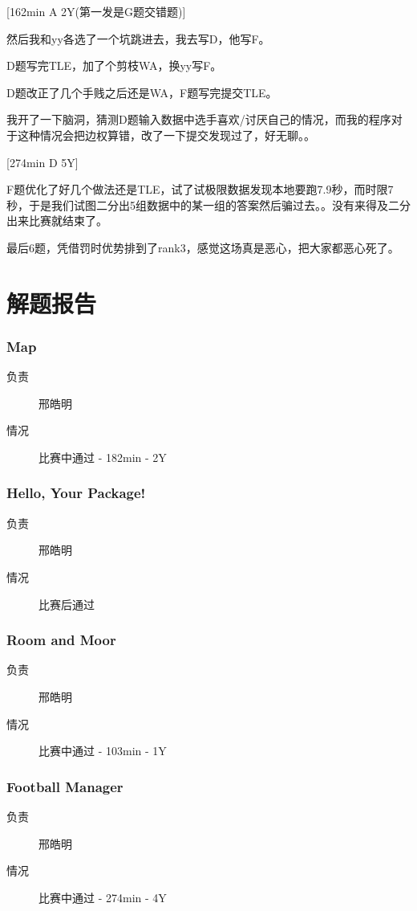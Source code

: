 \documentclass[a4paper, 11pt, nofonts, nocap, fancyhdr]{ctexart}
\newcommand{\problem}[1]{\subsubsection{#1}}
\begin{document}
[162min A 2Y(第一发是G题交错题)]

然后我和yy各选了一个坑跳进去，我去写D，他写F。

D题写完TLE，加了个剪枝WA，换yy写F。

D题改正了几个手贱之后还是WA，F题写完提交TLE。

我开了一下脑洞，猜测D题输入数据中选手喜欢/讨厌自己的情况，而我的程序对于这种情况会把边权算错，改了一下提交发现过了，好无聊。。

[274min D 5Y]

F题优化了好几个做法还是TLE，试了试极限数据发现本地要跑7.9秒，而时限7秒，于是我们试图二分出5组数据中的某一组的答案然后骗过去。。没有来得及二分出来比赛就结束了。

最后6题，凭借罚时优势排到了rank3，感觉这场真是恶心，把大家都恶心死了。 

\section{解题报告}

\problem{Map}

\begin{description}
\item[负责] 邢皓明
\item[情况] 比赛中通过 - 182min - 2Y
\end{description}



\problem{Hello, Your Package!}

\begin{description}
\item[负责] 邢皓明
\item[情况] 比赛后通过
\end{description}



\problem{Room and Moor}

\begin{description}
\item[负责] 邢皓明
\item[情况] 比赛中通过 - 103min - 1Y
\end{description}



\problem{Football Manager}

\begin{description}
\item[负责] 邢皓明
\item[情况] 比赛中通过 - 274min - 4Y
\end{description}
\end{document}
